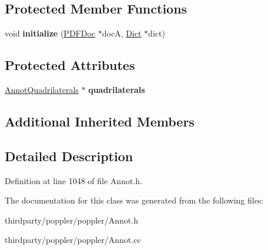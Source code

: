 \subsection*{Protected Member Functions}
\begin{DoxyCompactItemize}
\item 
\mbox{\label{class_annot_text_markup_a59142d4d5c4a4b90f882c946087220ff}} 
void {\bfseries initialize} (\hyperlink{class_p_d_f_doc}{P\+D\+F\+Doc} $\ast$docA, \hyperlink{class_dict}{Dict} $\ast$dict)
\end{DoxyCompactItemize}
\subsection*{Protected Attributes}
\begin{DoxyCompactItemize}
\item 
\mbox{\label{class_annot_text_markup_aa01a7b836042958637f946db7df575dc}} 
\hyperlink{class_annot_quadrilaterals}{Annot\+Quadrilaterals} $\ast$ {\bfseries quadrilaterals}
\end{DoxyCompactItemize}
\subsection*{Additional Inherited Members}


\subsection{Detailed Description}


Definition at line 1048 of file Annot.\+h.



The documentation for this class was generated from the following files\+:\begin{DoxyCompactItemize}
\item 
thirdparty/poppler/poppler/Annot.\+h\item 
thirdparty/poppler/poppler/Annot.\+cc\end{DoxyCompactItemize}
